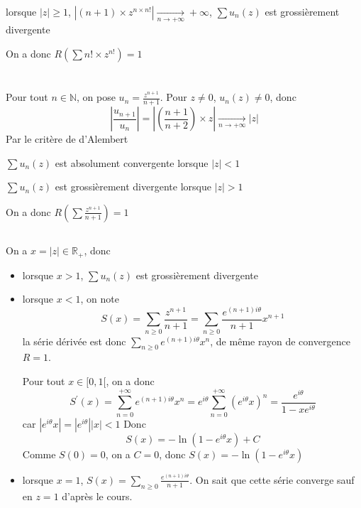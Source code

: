 \documentclass[a4paper,12pt]{book}
\begin{document}
lorsque $|z|\geq 1$, $\left|(n+1)\times z^{n \times n!}\right|\xrightarrow[n \to +\infty]{}+\infty$, $\sum u_n(z)$ est grossièrement divergente

On a donc $\boxed{R(\sum n!\times z^{n!})=1}$

\section{}
\subsection{}
Pour tout $n \in \mathbb{N}$, on pose $u_n=\frac{z^{n+1}}{n+1}$. Pour $z \neq 0$, $u_n(z) \neq 0$, donc 
$$
\left|\frac{u_{n+1}}{u_n}\right|=\left|(\frac{n+1}{n+2})\times z\right|\xrightarrow[n \to +\infty]{}|z|
$$
Par le critère de d'Alembert

$\sum u_n(z)$ est absolument convergente lorsque $|z|<1$

$\sum u_n(z)$ est grossièrement divergente lorsque $|z|>1$

On a donc $\boxed{R(\sum \frac{z^{n+1}}{n+1})=1}$
\subsection{}
On a $x=|z| \in \mathbb{R_+}$, donc 
\begin{itemize}
    \item lorsque $x>1$, $\sum u_n(z)$ est grossièrement divergente
    \item lorsque $x<1$, on note $$
    S(x)=\sum_{n \geq 0} \frac{z^{n+1}}{n+1}=\sum_{n \geq 0}\frac{e^{(n+1)i\theta}}{n+1}x^{n+1}
    $$
    la série dérivée est donc $\sum_{n \geq 0}e^{(n+1)i\theta}x^n $, de même rayon de convergence $R=1$. 

    Pour tout $x \in [0,1[$, on a donc 
    $$
    S^{'}(x)=\sum_{n = 0}^{+ \infty}e^{(n+1)i\theta}x^n=e^{i\theta}\sum_{n = 0}^{+ \infty}(e^{i\theta}x)^n=\frac{e^{i\theta}}{1-xe^{i\theta}}
    $$
    car $|e^{i\theta}x|=|e^{i\theta}||x|<1$
    Donc $$
    S(x)=-\ln(1-e^{i\theta}x)+C
    $$
    Comme $S(0)=0$, on a $C=0$, donc $S(x)=-\ln(1-e^{i\theta}x)$
    \item lorsque $x=1$, $S(x)=\sum_{n \geq 0}\frac{e^{(n+1)i\theta}}{n+1}$. On sait que cette série converge sauf en $z=1$ d'après le cours.
\end{itemize}


\subsection{}
\end{document}
